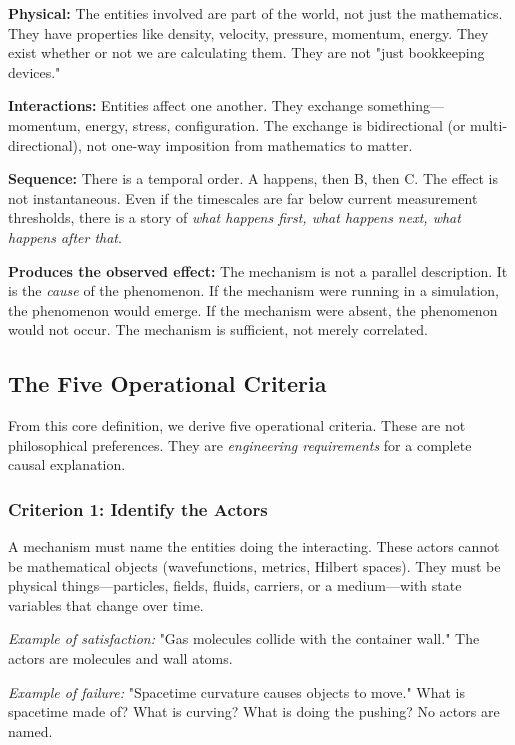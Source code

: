 \documentclass[12pt, a4paper]{article}
\begin{document}
\textbf{Physical:} The entities involved are part of the world, not just the mathematics. They have properties like density, velocity, pressure, momentum, energy. They exist whether or not we are calculating them. They are not "just bookkeeping devices."

\textbf{Interactions:} Entities affect one another. They exchange something—momentum, energy, stress, configuration. The exchange is bidirectional (or multi-directional), not one-way imposition from mathematics to matter.

\textbf{Sequence:} There is a temporal order. A happens, then B, then C. The effect is not instantaneous. Even if the timescales are far below current measurement thresholds, there is a story of \textit{what happens first, what happens next, what happens after that}.

\textbf{Produces the observed effect:} The mechanism is not a parallel description. It is the \textit{cause} of the phenomenon. If the mechanism were running in a simulation, the phenomenon would emerge. If the mechanism were absent, the phenomenon would not occur. The mechanism is sufficient, not merely correlated.

\subsection{The Five Operational Criteria}
\label{subsec:five_criteria}

From this core definition, we derive five operational criteria. These are not philosophical preferences. They are \textit{engineering requirements} for a complete causal explanation.

\subsubsection{Criterion 1: Identify the Actors}

A mechanism must name the entities doing the interacting. These actors cannot be mathematical objects (wavefunctions, metrics, Hilbert spaces). They must be physical things—particles, fields, fluids, carriers, or a medium—with state variables that change over time.

\textit{Example of satisfaction:} "Gas molecules collide with the container wall." The actors are molecules and wall atoms.

\textit{Example of failure:} "Spacetime curvature causes objects to move." What is spacetime made of? What is curving? What is doing the pushing? No actors are named.
\end{document}
